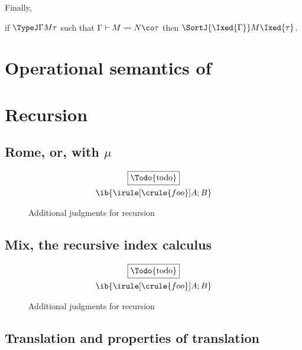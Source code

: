 \documentclass[authoryear,acmsmall,screen]{acmart}
\begin{document}
Finally,

\begin{theorem}
  if $\TypeJ \Gamma M \tau$ such that $\Gamma \vdash M \leadsto N \co \tau$ then $\SortJ {\Ixed{\Gamma}} M {\Ixed{\tau}}$.
\end{theorem}

\section{Operational semantics of \IX{}}

\section{Recursion}


\subsection{Rome, or, \RO with $\mu$}
\begin{figure}[H]
\small
\begin{gather*}
\fbox{\Todo{todo}}
\\
\ib{\irule[\crule{foo}]{A};{B}} \\
\end{gather*}
\caption{Additional \RO judgments for recursion}
\end{figure}

\subsection{Mix, the recursive index calculus}

\begin{figure}[H]
\small
\begin{gather*}
\fbox{\Todo{todo}}
\\
\ib{\irule[\crule{foo}]{A};{B}} \\
\end{gather*}
\caption{Additional \IX{} judgments for recursion}
\end{figure}

\subsection{Translation and properties of translation}



\end{document}
